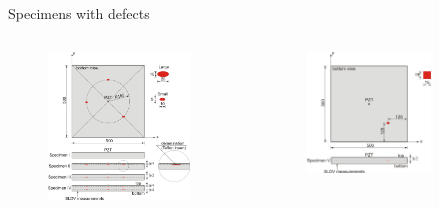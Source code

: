 \documentclass[10pt,aspectratio=169,dvipsnames]{beamer} %
\begin{document}
	\begin{frame}[t]{Specimens with defects}
		\vspace{-0.5cm}
		\begin{columns}[T]
			\begin{figure}
				\includegraphics[width=0.9\textwidth]{plate_multi_delam_arrangement_large_fonts.png}
			\end{figure}
			\begin{figure}
				\includegraphics[width=0.75\textwidth]{plate_single_delam_arrangement_large_fonts.png}
			\end{figure}
		\end{columns}
	\end{frame}
\end{document}
